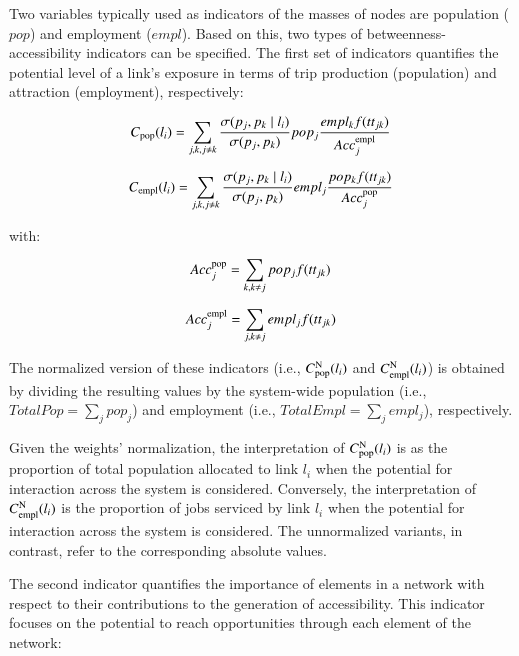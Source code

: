 \documentclass[]{elsarticle} %
\begin{document}
Two variables typically used as indicators of the masses of nodes are
population (\(pop\)) and employment (\(empl\)). Based on this, two types
of betweenness-accessibility indicators can be specified. The first set
of indicators quantifies the potential level of a link's exposure in
terms of trip production (population) and attraction (employment),
respectively:

\begin{equation}\label{f:btw_pop}
C_{\rm pop}(l_i) =\sum_{j,k,j\neq k} \frac{{\sigma(p_j,p_k \mid l_i)}}{\sigma(p_j,p_k)} pop_j\frac{{empl_k}{f(tt_{jk})}}{Acc^{\rm empl}_{j}}%
\end{equation}

\begin{equation}\label{f:btw_empl}
C_{\rm empl}(l_i) =\sum_{j,k,j\neq k} \frac{{\sigma(p_j,p_k \mid l_i)}}{\sigma(p_j,p_k)} empl_j\frac{{pop_k}{f(tt_{jk})}}{Acc^{\rm pop}_{j}}%
\end{equation}

\noindent with:

\begin{equation}\label{f:acc_pop}
Acc^{\rm pop}_{j}=\sum_{k,k\neq j} pop_jf(tt_{jk})
\end{equation}

\begin{equation}\label{f:acc_empl}
Acc^{\rm empl}_{j}=\sum_{j,k\neq j} empl_jf(tt_{jk})
\end{equation}

The normalized version of these indicators (i.e.,
\(C_{\rm pop}^{\rm N}(l_i)\) and \(C_{\rm empl}^{\rm N}(l_i)\)) is
obtained by dividing the resulting values by the system-wide population
(i.e., \(TotalPop={\sum\limits_{j}{pop_{j}}}\)) and employment (i.e.,
\(TotalEmpl={\sum\limits_{j}{empl_{j}}}\)), respectively.

Given the weights' normalization, the interpretation of
\(C_{\rm pop}^{\rm N}(l_i)\) is as the proportion of total population
allocated to link \(l_i\) when the potential for interaction across the
system is considered. Conversely, the interpretation of
\(C_{\rm empl}^{\rm N}(l_i)\) is the proportion of jobs serviced by link
\(l_i\) when the potential for interaction across the system is
considered. The unnormalized variants, in contrast, refer to the
corresponding absolute values.

The second indicator quantifies the importance of elements in a network
with respect to their contributions to the generation of accessibility.
This indicator focuses on the potential to reach opportunities through
each element of the network:
\end{document}
